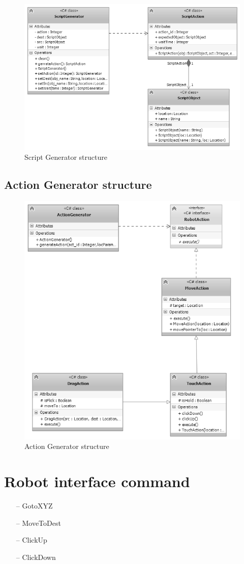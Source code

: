 	\begin{figure}[H]
		\centering
		\includegraphics[scale=0.75]{Chapters/Fig/script_gen.png}
		\caption{Script Generator structure}
		\label{fig:script_gen}
	\end{figure}



\subsection{Action Generator structure}

	\begin{figure}[H]
		\centering
		\includegraphics[scale=0.75]{Chapters/Fig/act_gen.png}
		\caption{Action Generator structure}
		\label{fig:act_gen}
	\end{figure}

\section{Robot interface command}

	\begin{itemize}
		\item[--] GotoXYZ
		\item[--] MoveToDest
		\item[--] ClickUp
		\item[--] ClickDown
	\end{itemize}
